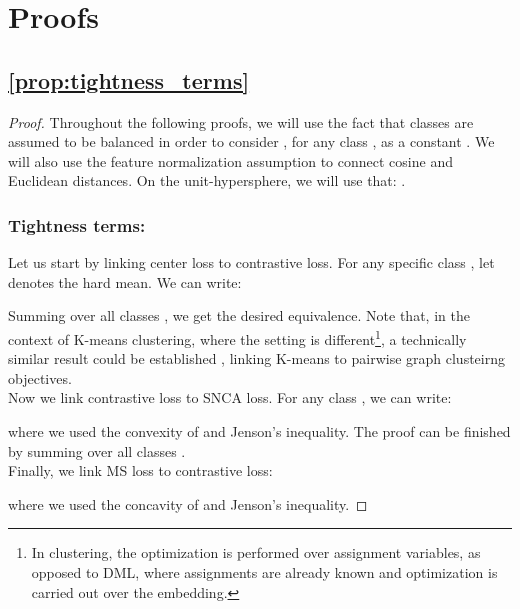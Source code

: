 \documentclass[runningheads]{llncs}
\begin{document}
\clearpage



\clearpage
\appendix
\section{Proofs}

    \subsection{\autoref{prop:tightness_terms}}\label{appendix:proof_tightness_terms}
        \begin{proof}
            Throughout the following proofs, we will use the fact that classes are assumed to be balanced in order to consider , for any class , as a constant . We will also use the feature normalization assumption to connect cosine and Euclidean distances. On the unit-hypersphere, we will use that: .\\
            
            \subsubsection{Tightness terms:}
            Let us start by linking center loss to contrastive loss. For any specific class , let   denotes the hard mean. We can write:
            
            Summing over all classes , we get the desired equivalence. Note that, in the context of K-means clustering, where the setting is different\footnote{In clustering, the optimization is performed over assignment variables, as opposed to DML, where assignments are already known and optimization is carried out over the embedding.}, a technically similar result could be established \cite{tang2015kernel}, linking K-means to pairwise graph clusteirng objectives. \\
            
            \noindent
            Now we link contrastive loss to SNCA loss. For any class , we can write:
            
            where we used the convexity of  and Jenson's inequality. The proof can be finished by summing over all classes . \\
            
            Finally, we link MS loss \cite{wang2019multi} to contrastive loss:
            
            where we used the concavity of  and  Jenson's inequality.
            

\end{proof}
\end{document}
